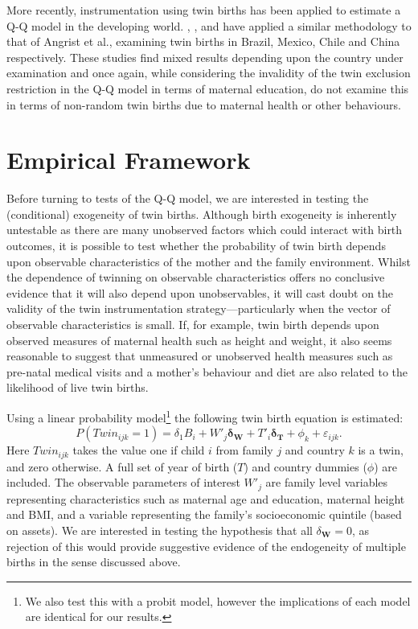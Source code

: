 \documentclass{article}[11pt,subeqn]
\newcommand{\vect}[1]{\mathbf{#1}}
\begin{document}
\begin{spacing}{1.5}
More recently, instrumentation using twin births has been applied to estimate a Q-Q model in the developing world. \cite{SouzaPonczek2012}, 
\cite{FitzsimonsMalde2010}, \citet{Sanhueza2009} and \citet{Lietal2008} have applied a similar methodology to that of Angrist et al., 
examining twin births in Brazil, Mexico, Chile and China respectively.  These studies find mixed results depending upon the country under 
examination and once again, while considering the invalidity of the twin exclusion restriction in the Q-Q model in terms of maternal education, 
do not examine this in terms of non-random twin births due to maternal health or other behaviours. 

\section{Empirical Framework}
\label{scn:EF}

Before turning to tests of the Q-Q model, we are interested in testing the (conditional) exogeneity of twin births.  Although birth exogeneity is 
inherently untestable as there are many unobserved factors which could interact with birth outcomes, it is possible to test whether the probability of twin birth depends upon observable 
characteristics of the mother and the family environment.  Whilst the dependence of twinning on observable characteristics offers no conclusive evidence 
that it will also depend upon unobservables, it will cast doubt on the validity of the twin instrumentation strategy---particularly when the vector of 
observable characteristics is small.  If, for example, twin birth depends upon observed measures of maternal health such as height 
and weight, it also seems reasonable to suggest that unmeasured or unobserved health measures such as pre-natal medical visits and a mother's behaviour 
and diet are also related to the likelihood of live twin births. 

Using a linear probability model\footnote{We also test this with a probit model, however the implications of each model are identical for our results.} 
the following twin birth equation is estimated: 
\begin{equation}
\label{eqn:twinpred}
P(Twin_{ijk}=1)=\delta_1 B_i + W'_j\vect{\delta_\vect{W}}+ T'_{i}\vect{\delta_\vect{T}} +  \phi_k + \varepsilon_{ijk}.
\end{equation}
Here $Twin_{ijk}$ takes the value one if child $i$ from family $j$ and country $k$ is a twin, and zero otherwise.  A full set of year of birth ($T$) and country
dummies ($\phi$) are included.  The observable parameters of interest $W'_j$ are family level variables representing characteristics such as maternal age and
education, maternal height and BMI, and a variable representing the family's socioeconomic quintile (based on assets).  We are interested in testing the
hypothesis that all $\delta_\vect{W}=0$, as rejection of this would provide suggestive evidence of the endogeneity of multiple births in the sense discussed
above.


\end{spacing}
\end{document}
